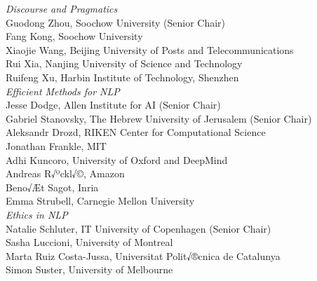 \emph{Discourse and Pragmatics} \\
\hspace*{0.2in} Guodong Zhou, Soochow University (Senior Chair)\\
\hspace*{0.2in} Fang Kong, Soochow University\\
\hspace*{0.2in} Xiaojie Wang, Beijing University of Posts and Telecommunications\\
\hspace*{0.2in} Rui Xia, Nanjing University of Science and Technology\\
\hspace*{0.2in} Ruifeng Xu, Harbin Institute of Technology, Shenzhen\\

\emph{Efficient Methods for NLP} \\
\hspace*{0.2in} Jesse Dodge, Allen Institute for AI (Senior Chair)\\
\hspace*{0.2in} Gabriel Stanovsky, The Hebrew University of Jerusalem (Senior Chair)\\
\hspace*{0.2in} Aleksandr Drozd, RIKEN Center for Computational Science\\
\hspace*{0.2in} Jonathan Frankle, MIT\\
\hspace*{0.2in} Adhi Kuncoro, University of Oxford and DeepMind\\
\hspace*{0.2in} Andreas R√ºckl√©, Amazon\\
\hspace*{0.2in} Beno√Æt Sagot, Inria\\
\hspace*{0.2in} Emma Strubell, Carnegie Mellon University\\

\emph{Ethics in NLP} \\
\hspace*{0.2in} Natalie Schluter, IT University of Copenhagen (Senior Chair)\\
\hspace*{0.2in} Sasha Luccioni, University of Montreal \\
\hspace*{0.2in} Marta Ruiz Costa-Jussa, Universitat Polit√®cnica de Catalunya\\
\hspace*{0.2in} Simon Suster, University of Melbourne\\

